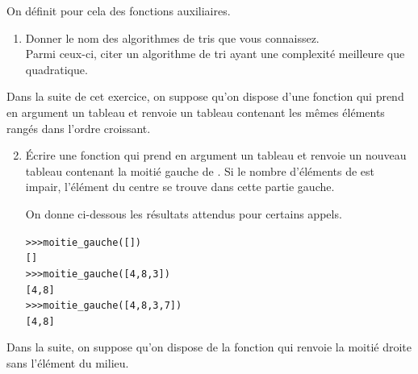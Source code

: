 \documentclass[11pt,a4paper,french,twoside]{PMCours}
\begin{document}
On définit pour cela des fonctions auxiliaires.
\begin{enumerate}
\item Donner le nom des algorithmes de tris que vous connaissez. \\
Parmi ceux-ci, citer un algorithme de tri ayant une complexité meilleure que quadratique.
\end{enumerate}

Dans la suite de cet exercice, on suppose qu'on dispose d'une fonction  qui prend en
argument un tableau et renvoie un tableau contenant les mêmes éléments rangés dans l'ordre
croissant.

\begin{enumerate}\setcounter{enumi}{1}
\item Écrire une fonction  qui prend en argument un tableau  et
renvoie un nouveau tableau contenant la moitié gauche de . Si le nombre d'éléments
de  est impair, l'élément du centre se trouve dans cette partie gauche.

On donne ci-dessous les résultats attendus pour certains appels.
\begin{alltt}
>>> moitie\_gauche([])
[]
>>> moitie\_gauche([4, 8, 3])
[4, 8]
>>> moitie\_gauche ([4, 8, 3, 7])
[4, 8]
\end{alltt}
\end{enumerate}

Dans la suite, on suppose qu'on dispose de la fonction  qui renvoie la
moitié droite sans l'élément du milieu.
\end{document}
